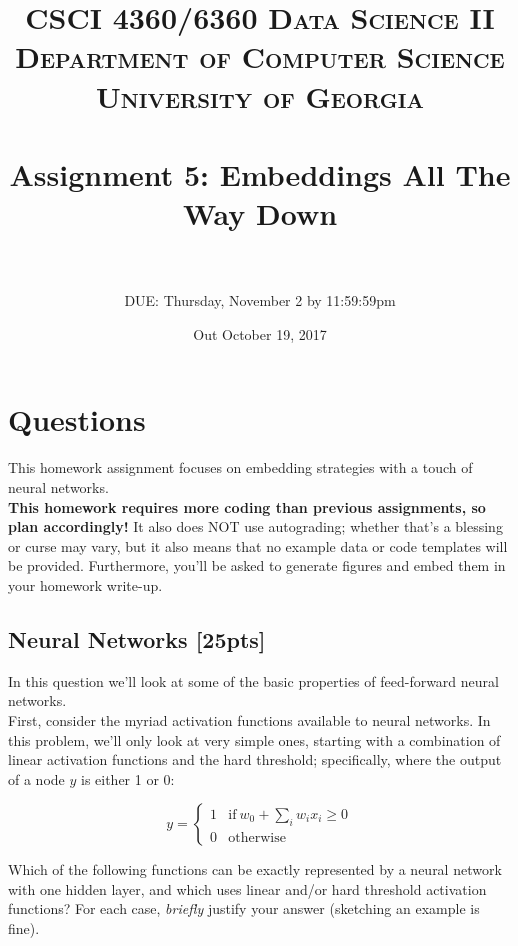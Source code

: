 \documentclass[paper=a4, fontsize=11pt]{scrartcl} %
\title{	
\normalfont \normalsize 
\textsc{CSCI 4360/6360 Data Science II} \\
\textsc{Department of Computer Science} \\
\textsc{University of Georgia} \\ [15pt] %
\horrule{0.5pt} \\[0.3cm] %
\huge Assignment 5: Embeddings All The Way Down \\ %
\horrule{2pt} \\[0.4cm] %
}
\author{DUE: Thursday, November 2 by 11:59:59pm} %
\date{\normalsize Out October 19, 2017}
\numberwithin{figure}{section} %
\numberwithin{table}{section} %
\begin{document}
\maketitle %


\section*{Questions}

This homework assignment focuses on embedding strategies with a touch of neural networks. \\

\textbf{This homework requires more coding than previous assignments, so plan accordingly!} It also does NOT use autograding; whether that's a blessing or curse may vary, but it also means that no example data or code templates will be provided. Furthermore, you'll be asked to generate figures and embed them in your homework write-up.

\setcounter{subsection}{0}

\subsection{Neural Networks \textbf{[25pts]}}

In this question we'll look at some of the basic properties of feed-forward neural networks. \\

First, consider the myriad activation functions available to neural networks. In this problem, we'll only look at very simple ones, starting with a combination of linear activation functions and the hard threshold; specifically, where the output of a node $y$ is either 1 or 0:

$$
y = \begin{cases}
	1 & \textrm{if}\ w_0 + \sum_i w_ix_i \ge 0 \\
	0 & \textrm{otherwise}
\end{cases}
$$

Which of the following functions can be exactly represented by a neural network with one hidden layer, and which uses linear and/or hard threshold activation functions? For each case, \emph{briefly} justify your answer (sketching an example is fine). \\
\end{document}
